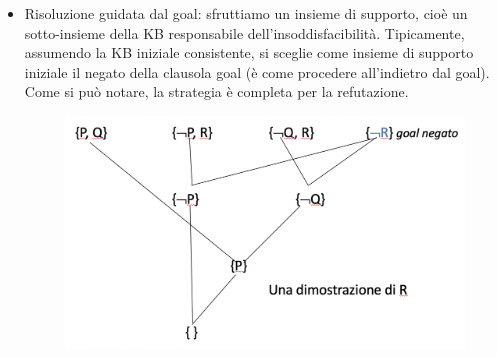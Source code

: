 \documentclass{article}
\begin{document}
\begin{itemize}
\begin{figure}[H]
        \end{figure}
    \item Risoluzione guidata dal goal: sfruttiamo un insieme di supporto, cioè un sotto-insieme della KB responsabile dell'insoddisfacibilità. Tipicamente, assumendo la KB iniziale consistente, si sceglie come insieme di supporto iniziale il negato della clausola goal (è come procedere all'indietro dal goal). Come si può notare, la strategia è completa per la refutazione.
        \begin{figure}[H]
        \centering
        \includegraphics[scale=0.4]{Images/risoluzioneindietro.png}
        \end{figure}
\end{itemize}
\end{document}
